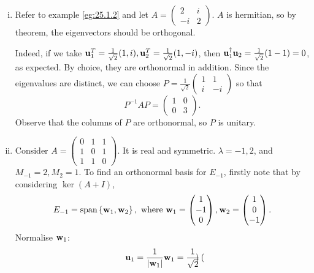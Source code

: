 \documentclass[10pt]{article}
\def\i{{\mathrm i}}
\DeclareMathOperator{\spn}{span}
\begin{document}
    \begin{example}
        \begin{enumerate}[(i)]
            \item Refer to example \ref{eg:25.1.2} and let $ A = \begin{pmatrix}
                2&i\\-i&2
            \end{pmatrix} $. $A$ is hermitian, so by theorem, the eigenvectors should be orthogonal.

            Indeed, if we take $ {\bf u}_1^T=\frac{1}{\sqrt{2}}(1,i), {\bf u}_2^T=\frac{1}{\sqrt{2}}(1,-i) $, then $ {\bf u}_1^\dagger {\bf u}_2=\frac{1}{\sqrt{2}}(1-1)=0 $, as expected. By choice, they are orthonormal in addition. Since the eigenvalues are distinct, we can choose $ \displaystyle P = \frac{1}{\sqrt{2}}\begin{pmatrix}
                1&1\\i&-i
            \end{pmatrix} $ so that 
            \[
                P^{-1}AP=\begin{pmatrix}
                    1&0\\
                    0&3
                \end{pmatrix}.
            \]
            Observe that the columns of $P$ are orthonormal, so $P$ is unitary.
            \item Consider $ A = \begin{pmatrix}
                0&1&1\\
                1&0&1\\
                1&1&0
            \end{pmatrix} $. It is real and symmetric. $ \lambda=-1,2 $, and $ M_{-1}=2, M_{2}=1 $. To find an orthonormal basis for $ E_{-1} $, firstly note that by considering $ \ker (A+I) $, 
            \[
                E_{-1}=\spn\left\{ \bfw_1,\bfw_2 \right\}, \text{ where } \bfw_1=\begin{pmatrix}
                    1\\-1\\0
                \end{pmatrix}, \bfw_2=\begin{pmatrix}
                    1\\0\\-1
                \end{pmatrix}.
            \]
            Normalise ${\bf w}_1$:
            \[
                {\bf u}_1=\frac{1}{|{\bf w}_1|}{\bf w}_1=\frac{1}{\sqrt{2}}\begin{pmatrix}

\end{pmatrix}\]
\end{enumerate}
\end{example}
\end{document}
